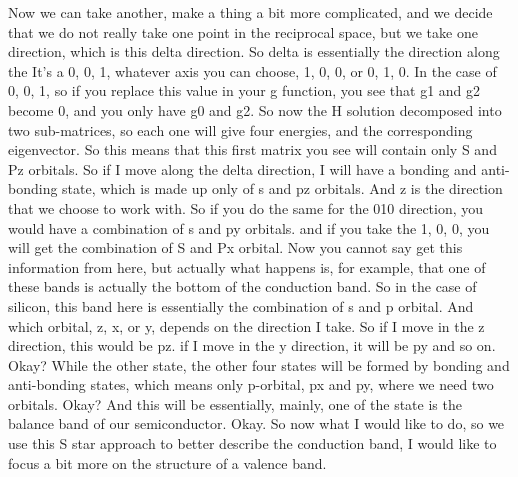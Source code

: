 Now we can take another, make a thing a bit more complicated, and we decide that we do not really take one point in the reciprocal space, but we take one direction, which is this delta direction. So delta is essentially the direction along the It's a 0, 0, 1, whatever axis you can choose, 1, 0, 0, or 0, 1, 0. In the case of 0, 0, 1, so if you replace this value in your g function, you see that g1 and g2 become 0, and you only have g0 and g2. So now the H solution decomposed into two sub-matrices, so each one will give four energies, and the corresponding eigenvector. So this means that this first matrix you see will contain only S and Pz orbitals. So if I move along the delta direction, I will have a bonding and anti-bonding state, which is made up only of s and pz orbitals. And z is the direction that we choose to work with. So if you do the same for the 010 direction, you would have a combination of s and py orbitals. and if you take the 1, 0, 0, you will get the combination of S and Px orbital. Now you cannot say get this information from here, but actually what happens is, for example, that one of these bands is actually the bottom of the conduction band. So in the case of silicon, this band here is essentially the combination of s and p orbital. And which orbital, z, x, or y, depends on the direction I take. So if I move in the z direction, this would be pz. if I move in the y direction, it will be py and so on. Okay? While the other state, the other four states will be formed by bonding and anti-bonding states, which means only p-orbital, px and py, where we need two orbitals. Okay? And this will be essentially, mainly, one of the state is the balance band of our semiconductor. Okay. So now what I would like to do, so we use this S star approach to better describe the conduction band, I would like to focus a bit more on the structure of a valence band.
